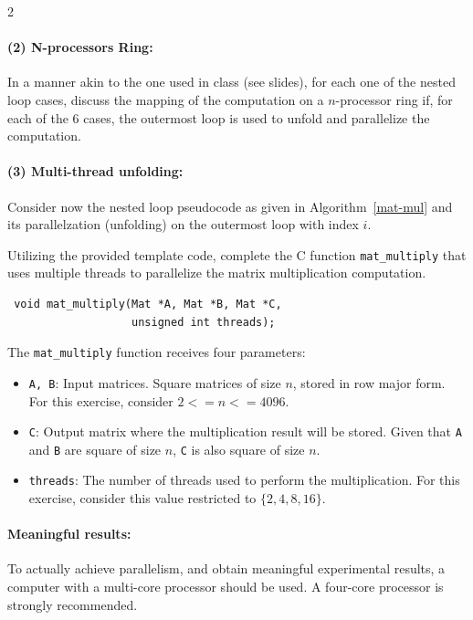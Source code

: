 \documentclass[12pt]{article}
\begin{document}
\begin{multicols}{2}
\paragraph{(2) N-processors Ring:} In a manner akin to the one used in class (see slides), for each one of the nested loop cases, discuss the mapping of the computation on a $n$-processor ring if, for each of the 6 cases, the outermost loop is used to unfold and parallelize the computation.

\paragraph{(3) Multi-thread unfolding:} Consider now the nested loop pseudocode as given in Algorithm~\ref{mat-mul} and its parallelzation (unfolding) on the outermost loop with index $i$.

Utilizing the provided template code, complete the C function \texttt{mat\_multiply} that uses multiple threads to parallelize the matrix multiplication computation.

{
  \footnotesize
  \centering
\begin{verbatim}
 void mat_multiply(Mat *A, Mat *B, Mat *C,
                   unsigned int threads);
\end{verbatim}
}

The \texttt{mat\_multiply} function receives four parameters:
\begin{itemize}
  \item \texttt{A, B}: Input matrices. Square matrices of size $n$, stored in row major form. For this exercise, consider $2 <= n <= 4096$.

  \item \texttt{C}: Output matrix where the multiplication result will be stored. Given that \texttt{A} and \texttt{B} are square of size $n$, \texttt{C} is also square of size $n$.

  \item \texttt{threads}: The number of threads used to perform the multiplication. For this exercise, consider this value restricted to $\{2,4,8,16\}$.
\end{itemize}

\paragraph{Meaningful results:} To actually achieve parallelism, and obtain meaningful experimental results, a computer with a multi-core processor should be used. A four-core processor is strongly recommended.


\end{multicols}
\end{document}
